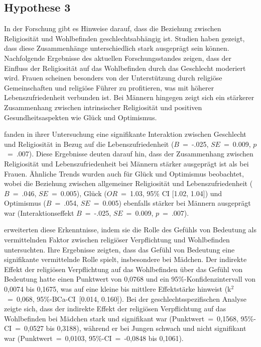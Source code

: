\subsection{Hypothese 3}    \label{subsec_2.2.3}
In der Forschung gibt es Hinweise darauf, dass die Beziehung zwischen Religiosität und Wohlbefinden geschlechtsabhängig ist. Studien haben gezeigt, dass diese Zusammenhänge unterschiedlich stark ausgeprägt sein können.
Nachfolgende Ergebnisse des aktuellen Forschungsstandes zeigen, dass der Einfluss der Religiosität auf das Wohlbefinden durch das Geschlecht moderiert wird. Frauen scheinen besonders von der Unterstützung durch religiöse Gemeinschaften und religiöse Führer zu profitieren, was mit höherer Lebenszufriedenheit verbunden ist. Bei Männern hingegen zeigt sich ein stärkerer Zusammenhang zwischen intrinsischer Religiosität und positiven Gesundheitsaspekten wie Glück und Optimismus.

\textcite{KoenigShohaib2023} fanden in ihrer Untersuchung eine signifikante Interaktion zwischen Geschlecht und Religiosität in Bezug auf die Lebenszufriedenheit ($B$~=~-.025, $SE$~=~0.009, $p$~=~.007). Diese Ergebnisse deuten darauf hin, dass der Zusammenhang zwischen Religiosität und Lebenszufriedenheit bei Männern stärker ausgeprägt ist als bei Frauen. Ähnliche Trends wurden auch für Glück und Optimismus beobachtet, wobei die Beziehung zwischen allgemeiner Religiosität und Lebenszufriedenheit ($B$~=~.046, $SE$~=~0.005), Glück ($OR$~=~1.03, 95\% CI [1.02, 1.04]) und Optimismus ($B$~=~.054, $SE$~=~0.005) ebenfalls stärker bei Männern ausgeprägt war (Interaktionseffekt $B$~=~-.025, $SE$~=~0.009, $p$~=~.007).

\textcite{DarIqbal2019} erweiterten diese Erkenntnisse, indem sie die Rolle des Gefühls von Bedeutung als vermittelnden Faktor zwischen religiöser Verpflichtung und Wohlbefinden untersuchten. Ihre Ergebnisse zeigten, dass das Gefühl von Bedeutung eine signifikante vermittelnde Rolle spielt, insbesondere bei Mädchen. Der indirekte Effekt der religiösen Verpflichtung auf das Wohlbefinden über das Gefühl von Bedeutung hatte einen Punktwert von 0,0768 und ein 95\%-Konfidenzintervall von 0,0074 bis 0,1675, was auf eine kleine bis mittlere Effektstärke hinweist (k$^2$~=~0,068, 95\%-BCa-CI~[0.014, 0.160]). Bei der geschlechtsspezifischen Analyse zeigte sich, dass der indirekte Effekt der religiösen Verpflichtung auf das Wohlbefinden bei Mädchen stark und signifikant war (Punktwert~=~0,1568, 95\%-CI~=~0,0527 bis 0,3188), während er bei Jungen schwach und nicht signifikant war (Punktwert~=~0,0103, 95\%-CI~=~-0,0848 bis 0,1061).

